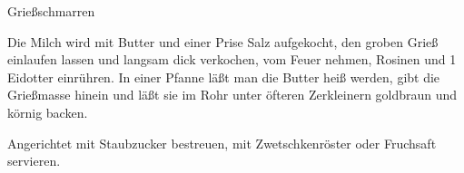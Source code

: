 \begin{recipe}{Grießschmarren}
%
%
%
%
%

\begin{ingredients}
\end{ingredients}

\begin{instructions}
    Die Milch wird mit Butter und einer Prise Salz aufgekocht, den groben Grieß einlaufen lassen und langsam dick verkochen, vom Feuer nehmen, Rosinen und 1 Eidotter einrühren.
    In einer Pfanne läßt man die Butter heiß werden, gibt die Grießmasse hinein und läßt sie im Rohr unter öfteren Zerkleinern goldbraun und körnig backen.

    Angerichtet mit Staubzucker bestreuen, mit Zwetschkenröster oder Fruchsaft servieren.
\end{instructions}
\end{recipe}
